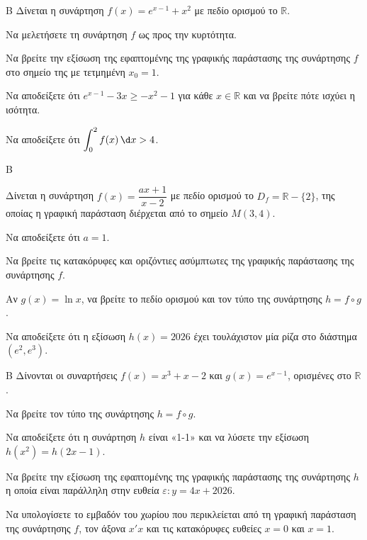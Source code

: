 \begin{thema}{Β}
Δίνεται η συνάρτηση $f(x) = e^{x-1} + x^2$ με πεδίο ορισμού το $\mathbb{R}$.
\begin{erwthma}
\item Να μελετήσετε τη συνάρτηση $f$ ως προς την κυρτότητα.
\item Να βρείτε την εξίσωση της εφαπτομένης της γραφικής παράστασης της συνάρτησης $f$ στο σημείο της με τετμημένη $x_0 = 1$.
\item Να αποδείξετε ότι $e^{x-1} -3x \ge -x^2 - 1$ για κάθε $x \in \mathbb{R}$ και να βρείτε πότε ισχύει η ισότητα.
\item Να αποδείξετε ότι $\displaystyle\int_{0}^{2} f(x)\,\d x > 4$.
\end{erwthma}
\end{thema}

\begin{thema}{Β}

Δίνεται η συνάρτηση $f(x) = \dfrac{a x + 1}{x - 2}$ με πεδίο ορισμού το $D_f = \mathbb{R} - \{2\}$, της οποίας η γραφική παράσταση διέρχεται από το σημείο $M(3, 4)$. 
\begin{erwthma}
\item Να αποδείξετε ότι $a = 1$.
\item Να βρείτε τις κατακόρυφες και οριζόντιες ασύμπτωτες της γραφικής παράστασης της συνάρτησης $f$.
\item Αν $g(x) = \ln x$, να βρείτε το πεδίο ορισμού και τον τύπο της συνάρτησης $h = f \circ g$.
\item Να αποδείξετε ότι η εξίσωση $h(x) = 2026$ έχει τουλάχιστον μία ρίζα στο διάστημα $(e^2, e^3)$.
\end{erwthma}
\end{thema}

\begin{thema}{Β}
Δίνονται οι συναρτήσεις $f(x) = x^3 + x - 2$ και $g(x) = e^{x-1}$, ορισμένες στο $\mathbb{R}$.
\begin{erwthma}
\item Να βρείτε τον τύπο της συνάρτησης $h = f \circ g$.
\item Να αποδείξετε ότι η συνάρτηση $h$ είναι «1-1» και να λύσετε την εξίσωση $h(x^2) = h(2x-1)$.
\item Να βρείτε την εξίσωση της εφαπτομένης της γραφικής παράστασης της συνάρτησης $h$ η οποία είναι παράλληλη στην ευθεία $\varepsilon: y = 4x + 2026$.
\item Να υπολογίσετε το εμβαδόν του χωρίου που περικλείεται από τη γραφική παράσταση της συνάρτησης $f$, τον άξονα $x'x$ και τις κατακόρυφες ευθείες $x=0$ και $x=1$.
\end{erwthma}
\end{thema}


